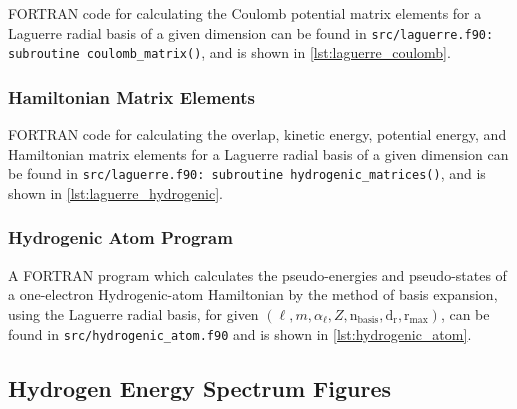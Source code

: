 \documentclass[]{article}
\begin{document}
FORTRAN code for calculating the Coulomb potential matrix elements for a
Laguerre radial basis of a given dimension can be found in
\lstinline[style=ff]{src/laguerre.f90: }\lstinline{subroutine coulomb_matrix()},
and is shown in \autoref{lst:laguerre_coulomb}.



\subsubsection{Hamiltonian Matrix Elements}
\label{sec:hamilt-matr-elem}

FORTRAN code for calculating the overlap, kinetic energy, potential energy, and
Hamiltonian matrix elements for a Laguerre radial basis of a given dimension can
be found in
\lstinline[style=ff]{src/laguerre.f90: }\lstinline{subroutine hydrogenic_matrices()},
and is shown in \autoref{lst:laguerre_hydrogenic}.



\subsubsection{Hydrogenic Atom Program}
\label{sec:hydr-atom-progr}

A FORTRAN program which calculates the pseudo-energies and pseudo-states of a
one-electron Hydrogenic-atom Hamiltonian by the method of basis expansion,
using the Laguerre radial basis, for given
$(\ell, m, \alpha_{\ell}, Z, \mathrm{n_{basis}}, \mathrm{d_{r}},
\mathrm{r_{max}})$, can be found in
\lstinline[style=ff]{src/hydrogenic_atom.f90}
and is shown in \autoref{lst:hydrogenic_atom}.



\clearpage
\subsection{Hydrogen Energy Spectrum Figures}
\label{sec:hydr-atom-progr-1}
\end{document}
